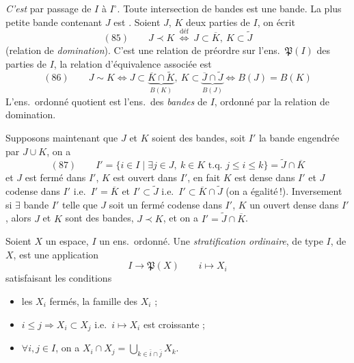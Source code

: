 \documentclass[11pt,a4paper]{article}
\begin{document}
\emph{C'est} \struck{\ill{} \ill{}} \add{\ill{}} \ill{} par passage de $I$ à $I^{\circ}$. Toute intersection de bandes est une bande. La plus petite bande contenant $J$ est  \ill{}. Soient $J$, $K$ deux  parties de $I$, on écrit
\[
(85)\qquad J\prec K\ \overset{\text{déf}}{\Longleftrightarrow}\ J\subset\overline K,\ K\subset\widetilde J
\]
(relation de \emph{domination}). C'est une relation de préordre sur l'ens.\ $\mathfrak P(I)$ des parties de $I$, la relation d'équivalence associée est
\[
(86)\qquad J\sim K\iff J\subset\underbrace{\overline K\cap\widetilde K}_{B(K)},\ K\subset\underbrace{\overline J\cap\widetilde J}_{B(J)}\iff B(J)=B(K)
\]
L'ens.\ ordonné quotient est l'ens.\ des \emph{bandes} de $I$, ordonné par la relation de \struck{\ill{}} domination.


Supposons maintenant que $J$ et $K$ soient des bandes,  soit $I'$ la bande engendrée par $J\cup K$, on a
\[
(87)\qquad I'=\lbrace i\in I\mid \exists j\in J,\ k\in K \text{ t.q. } j\le i\le k\rbrace=\widetilde J\cap\overline K
\]
et $J$ est fermé dans $I'$, $K$ est ouvert dans $I'$,  en fait $K$ est dense dans $I'$ et $J$ codense dans $I'$ i.e.\ $I'=\overline K$ et $I'\subset\widetilde J$ \struck{\ill{}} i.e.\ $I'\subset\overline K\cap\widetilde J$ (on a \ill{} égalité\,!). Inversement si $\exists$ bande $I'$ telle que $J$ soit un fermé codense dans $I'$, $K$ un ouvert dense dans $I'$, alors $J$ et $K$ sont des bandes, $J\prec K$, et on a $I'=\widetilde J\cap\overline K$.


 Soient $X$ un espace, $I$ un ens.\ ordonné. Une \emph{stratification ordinaire}, de type $I$, de $X$, est une application
\[
I\longrightarrow\mathfrak P(X)\qquad i\longmapsto X_i
\]
satisfaisant les \ill{} conditions
\begin{itemize}
\item[(Strat 1)] les $X_i$ fermés, la famille des $X_i$  ;
\item[(Strat 2)] $i\le j\Rightarrow X_i\subset X_j$ \quad i.e.\ $i\mapsto X_i$ est croissante ;
\item[(Strat 3)] $\forall i,j\in I$, on a \quad $X_i\cap X_j=\bigcup_{k\in\bar i\cap\bar j}X_k$.
\end{itemize}
\end{document}
